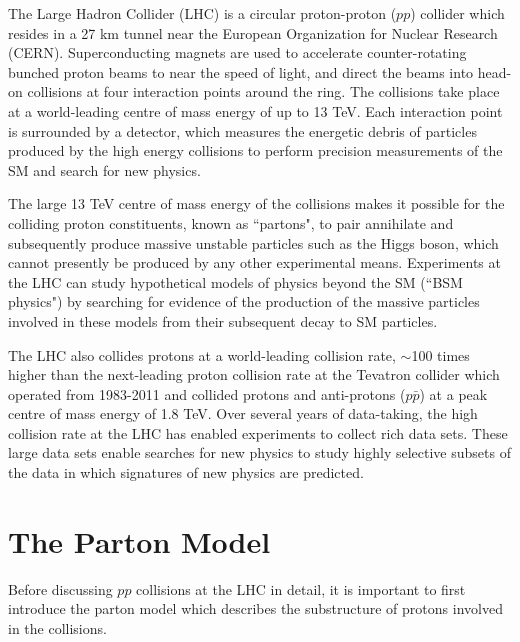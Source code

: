 \label{chapter:lhc_atlas}

The Large Hadron Collider (LHC) \cite{lhc_machine} is a circular proton-proton ($pp$) collider which resides in a 27 km tunnel near the European Organization for Nuclear Research (CERN). Superconducting magnets are used to accelerate counter-rotating bunched proton beams to near the speed of light, and direct the beams into head-on collisions at four interaction points around the ring. The collisions take place at a world-leading centre of mass energy of up to 13 TeV. Each interaction point is surrounded by a detector, which measures the energetic debris of particles produced by the high energy collisions to perform precision measurements of the SM and search for new physics.

The large 13 TeV centre of mass energy of the collisions makes it possible for the colliding proton constituents, known as ``partons", to pair annihilate and subsequently produce massive unstable particles such as the Higgs boson, which cannot presently be produced by any other experimental means. Experiments at the LHC can study hypothetical models of physics beyond the SM (``BSM physics") by searching for evidence of the production of the massive particles involved in these models from their subsequent decay to SM particles.

The LHC also collides protons at a world-leading collision rate, $\sim$100 times higher than the next-leading proton collision rate at the Tevatron collider \cite{tevatron} which operated from 1983-2011 and collided protons and anti-protons ($p\bar{p}$) at a peak centre of mass energy of 1.8 TeV. Over several years of data-taking, the high collision rate at the LHC has enabled experiments to collect rich data sets. These large data sets enable searches for new physics to study highly selective subsets of the data in which signatures of new physics are predicted.

\section{The Parton Model}
\label{sec:parton_model}

Before discussing $pp$ collisions at the LHC in detail, it is important to first introduce the parton model which describes the substructure of protons involved in the collisions. 

